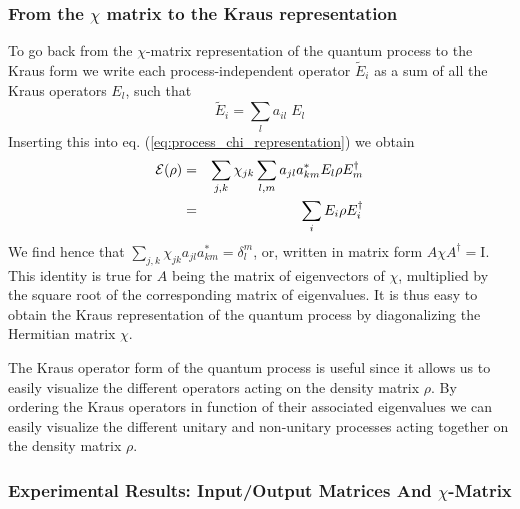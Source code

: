 \subsubsection{From the $\chi$ matrix to the Kraus representation}

To go back from the $\chi$-matrix representation of the quantum process to the Kraus form we write each process-independent operator $\tilde{E}_i$ as a sum of all the Kraus operators $E_l$, such that
%
\begin{equation}
	\tilde{E}_i = \sum\limits_l a_{il}\; E_l
\end{equation}
%
Inserting this into eq. (\ref{eq:process_chi_representation}) we obtain
%
\begin{eqnarray}
\begin{mathcal}E\end{mathcal}(\rho) & = & \sum\limits_{j,k}\chi_{jk}\sum\limits_{l,m} a_{jl}a_{km}^* E_l \rho E_m^\dagger   \label{eq:process_chi_transformed} \\
& = & \sum\limits_i E_i \rho E^\dagger_i
\end{eqnarray}
%
We find hence that $\sum\limits_{j,k} \chi_{jk}a_{jl}a_{km}^* = \delta_l^m$, or, written in matrix form $A\chi A^\dagger = \mathrm{I}$. This identity is true for $A$ being the matrix of eigenvectors of $\chi$, multiplied by the square root of the corresponding matrix of eigenvalues. It is thus easy to obtain the Kraus representation of the quantum process by diagonalizing the Hermitian matrix $\chi$.

\smallskip

The Kraus operator form of the quantum process is useful since it allows us to easily visualize the different operators acting on the density matrix $\rho$. By ordering the Kraus operators in function of their associated eigenvalues we can easily visualize the different unitary and non-unitary processes acting together on the density matrix $\rho$.

\subsubsection{Experimental Results: Input/Output Matrices And $\chi$-Matrix}

